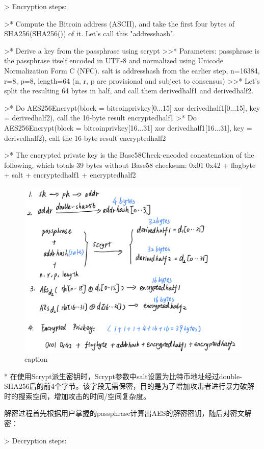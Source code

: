 > Encryption steps:

>* Compute the Bitcoin address (ASCII), and take the first four bytes of SHA256(SHA256()) of it. Let's call this "addresshash".

>* Derive a key from the passphrase using scrypt  
>>* Parameters: passphrase is the passphrase itself encoded in UTF-8 and normalized using Unicode Normalization Form C (NFC). salt is addresshash from the earlier step, n=16384, r=8, p=8, length=64 (n, r, p are provisional and subject to consensus)  
>>* Let's split the resulting 64 bytes in half, and call them derivedhalf1 and derivedhalf2.  

>* Do AES256Encrypt(block = bitcoinprivkey[0...15] xor derivedhalf1[0...15], key = derivedhalf2), call the 16-byte result encryptedhalf1  
>* Do AES256Encrypt(block = bitcoinprivkey[16...31] xor derivedhalf1[16...31], key = derivedhalf2), call the 16-byte result encryptedhalf2  

>* The encrypted private key is the Base58Check-encoded concatenation of the following, which totals 39 bytes without Base58 checksum:
0x01 0x42 + flagbyte + salt + encryptedhalf1 + encryptedhalf2

\begin{figure}[h]
\centering
\includegraphics[width=.7\textwidth]{./no-ec.png}
\caption{caption}\label{fig-parsesig}
\end{figure}


* 在使用Scrypt派生密钥时，Scrypt参数中salt设置为比特币地址经过double-SHA256后的前4个字节。该字段无需保密，目的是为了增加攻击者进行暴力破解时的搜索空间，增加攻击的时间/空间复杂度。



 解密过程首先根据用户掌握的passphrase计算出AES的解密密钥，随后对密文解密：

> Decryption steps:

